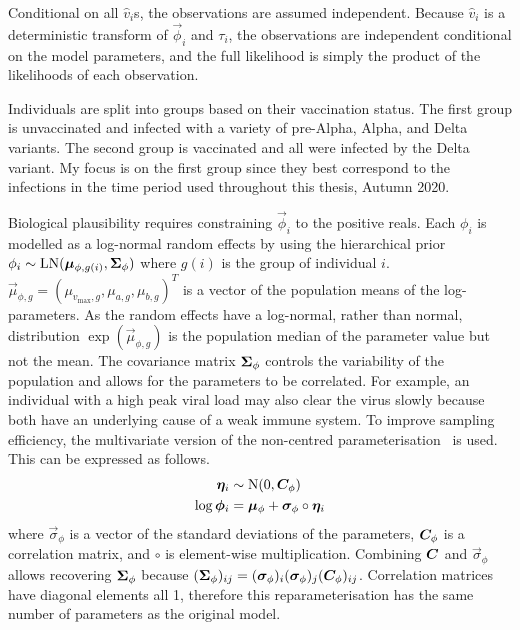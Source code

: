\documentclass[thesis.tex]{subfiles}
\begin{document}
Conditional on all $\hat{v}_i$s, the observations are assumed independent.
Because $\hat{v}_i$ is a deterministic transform of $\vec{\phi}_i$ and $\tau_i$, the observations are independent conditional on the model parameters, and the full likelihood is simply the product of the likelihoods of each observation.

Individuals are split into groups based on their vaccination status.
The first group is unvaccinated and infected with a variety of pre-Alpha, Alpha, and Delta variants.
The second group is vaccinated and all were infected by the Delta variant.
My focus is on the first group since they best correspond to the infections in the time period used throughout this thesis, Autumn 2020.

Biological plausibility requires constraining $\vec{\phi}_i$ to the positive reals.
Each $\phi_i$ is modelled as a log-normal random effects by using the hierarchical prior $\phi_i \sim \operatorname{LN}(\bm{\mu}_{\phi,g(i)}, \bm{\Sigma}_\phi)$ where $g(i)$ is the group of individual $i$.
$\vec{\mu}_{\phi,g} = (\mu_{v_{\max},g}, \mu_{a,g}, \mu_{b,g})^T$ is a vector of the population means of the log-parameters.
As the random effects have a log-normal, rather than normal, distribution $\exp(\vec{\mu}_{\phi,g})$ is the population median of the parameter value but not the mean.
The covariance matrix $\bm{\Sigma}_\phi$ controls the variability of the population and allows for the parameters to be correlated.
For example, an individual with a high peak viral load may also clear the virus slowly because both have an underlying cause of a weak immune system.
To improve sampling efficiency, the multivariate version of the non-centred parameterisation~\autocites{papaspiliopoulosGeneral,stanReparameterization} is used.
This can be expressed as follows.
\begin{align}
  \bm{\eta}_i &\sim \operatorname{N}(0, \bm{C}_\phi) \\
  \log \bm{\phi}_i &= \bm{\mu}_\phi + \bm{\sigma}_\phi \circ \bm{\eta}_i
\end{align}
where $\vec{\sigma}_\phi$ is a vector of the standard deviations of the parameters, $\bm{C}_\phi$ is a correlation matrix, and $\circ$ is element-wise multiplication.
Combining $\bm{C}$ and $\vec{\sigma}_\phi$ allows recovering $\bm\Sigma_\phi$ because $(\bm{\Sigma}_\phi)_{ij} = (\bm{\sigma}_\phi)_i (\bm{\sigma}_\phi)_j (\bm{C}_\phi)_{ij}$.
Correlation matrices have diagonal elements all 1, therefore this reparameterisation has the same number of parameters as the original model.
\end{document}
